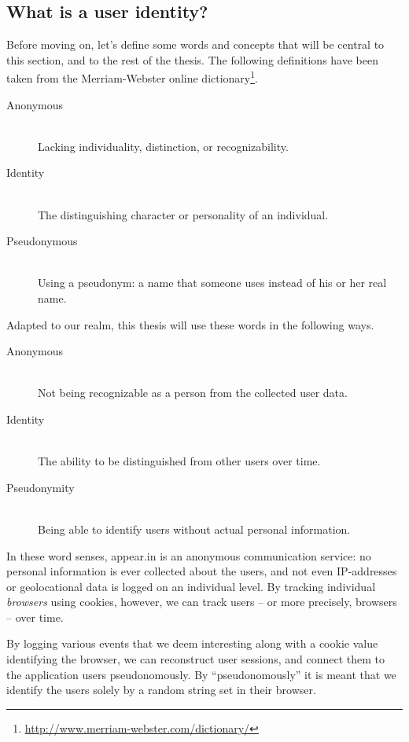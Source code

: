   \subsection{What is a user identity?}
  \label{survey:identity}

    Before moving on, let's define some words and concepts that will be central to this section, and to the rest of the thesis. The following definitions have been taken from the Merriam-Webster online dictionary\footnote{\url{http://www.merriam-webster.com/dictionary/}}.

    \begin{description}
      \item[Anonymous] \hfill \\
        Lacking individuality, distinction, or recognizability.
      \item[Identity] \hfill \\
        The distinguishing character or personality of an individual.
      \item[Pseudonymous] \hfill \\
        Using a pseudonym: a name that someone uses instead of his or her real name.
    \end{description}

    Adapted to our realm, this thesis will use these words in the following ways.

    \begin{description}
      \item[Anonymous] \hfill \\
        Not being recognizable as a person from the collected user data.
      \item[Identity] \hfill \\
        The ability to be distinguished from other users over time.
      \item[Pseudonymity] \hfill \\
        Being able to identify users without actual personal information.
    \end{description}

    In these word senses, appear.in is an anonymous communication service: no personal information is ever collected about the users, and not even IP-addresses or geolocational data is logged on an individual level. By tracking individual \emph{browsers} using cookies, however, we can track users -- or more precisely, browsers -- over time.

    By logging various events that we deem interesting along with a cookie value identifying the browser, we can reconstruct user sessions, and connect them to the application users pseudonomously. By ``pseudonomously'' it is meant that we identify the users solely by a random string set in their browser.

